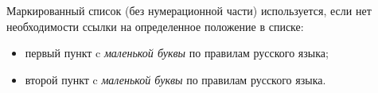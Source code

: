 Маркированный список (без нумерационной части) используется, если нет необходимости ссылки на определенное положение в списке:
\begin{itemize}
	\item первый пункт c {\itshape маленькой буквы} по правилам русского языка;
	\item второй пункт c {\itshape маленькой буквы} по правилам русского языка.
\end{itemize}